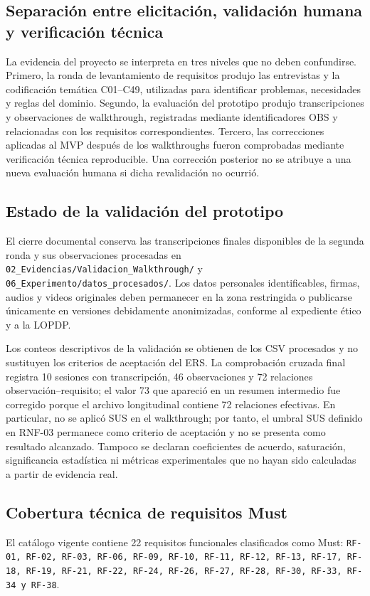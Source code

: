 \documentclass[11pt,a4paper]{article}
\begin{document}
	\subsection{Separación entre elicitación, validación humana y verificación técnica}
	La evidencia del proyecto se interpreta en tres niveles que no deben confundirse. Primero, la ronda de levantamiento de requisitos produjo las entrevistas y la codificación temática C01--C49, utilizadas para identificar problemas, necesidades y reglas del dominio. Segundo, la evaluación del prototipo produjo transcripciones y observaciones de walkthrough, registradas mediante identificadores OBS y relacionadas con los requisitos correspondientes. Tercero, las correcciones aplicadas al MVP después de los walkthroughs fueron comprobadas mediante verificación técnica reproducible. Una corrección posterior no se atribuye a una nueva evaluación humana si dicha revalidación no ocurrió.
	
	\subsection{Estado de la validación del prototipo}
	El cierre documental conserva las transcripciones finales disponibles de la segunda ronda y sus observaciones procesadas en \texttt{02\_Evidencias/Validacion\_Walkthrough/} y \texttt{06\_Experimento/datos\_procesados/}. Los datos personales identificables, firmas, audios y videos originales deben permanecer en la zona restringida o publicarse únicamente en versiones debidamente anonimizadas, conforme al expediente ético y a la LOPDP.
	
	Los conteos descriptivos de la validación se obtienen de los CSV procesados y no sustituyen los criterios de aceptación del ERS. La comprobación cruzada final registra 10 sesiones con transcripción, 46 observaciones y 72 relaciones observación--requisito; el valor 73 que apareció en un resumen intermedio fue corregido porque el archivo longitudinal contiene 72 relaciones efectivas. En particular, no se aplicó SUS en el walkthrough; por tanto, el umbral SUS definido en RNF-03 permanece como criterio de aceptación y no se presenta como resultado alcanzado. Tampoco se declaran coeficientes de acuerdo, saturación, significancia estadística ni métricas experimentales que no hayan sido calculadas a partir de evidencia real.
	
	\subsection{Cobertura técnica de requisitos Must}
	El catálogo vigente contiene 22 requisitos funcionales clasificados como Must:
	\texttt{RF-01, RF-02, RF-03, RF-06, RF-09, RF-10, RF-11, RF-12, RF-13, RF-17, RF-18, RF-19, RF-21, RF-22, RF-24, RF-26, RF-27, RF-28, RF-30, RF-33, RF-34 y RF-38}.
	
\end{document}
